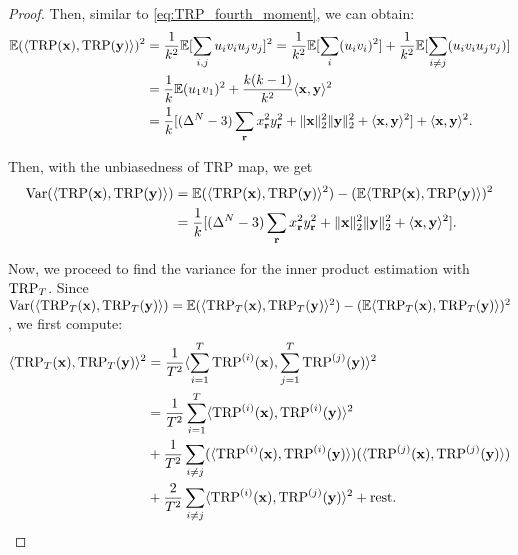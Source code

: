 \begin{proof}
Then, similar to \eqref{eq:TRP_fourth_moment}, we can obtain:  
\begin{equation}\label{eq:inner_prod_second_moment}
\begin{aligned}
\mathbb{E}(\langle \textup{TRP}(\mathbf{x}), \textup{TRP}(\mathbf{y}) \rangle)^2 &= \frac{1}{k^2}\mathbb{E}[ \sum_{i,j} u_iv_iu_jv_j]^2 
= \frac{1}{k^2}\mathbb{E}[ \sum_{i} (u_iv_i)^2]  + 
\frac{1}{k^2} \mathbb{E}[\sum_{i \neq j}(u_i v_i u_j v_j)]  \\
&= \frac{1}{k} \mathbb{E}(u_1v_1)^2 + \frac{k(k-1)}{k^2} \langle \mathbf{x}, \mathbf{y}\rangle^2\\ 
&= \frac{1}{k} [ (\Delta^N - 3) \sum_{\mathbf{r}}x_{\mathbf{r}}^2y_{\mathbf{r}}^2  + \|\mathbf{x}\|_2^2\|\mathbf{y}\|^2_2 + \langle \mathbf{x}, \mathbf{y} \rangle^2 ] + \langle \mathbf{x}, \mathbf{y}\rangle^2.
\end{aligned} 
\end{equation} 

Then, with the unbiasedness of TRP map, we get
\begin{equation}
\begin{aligned}
\textrm{Var}(\langle \textup{TRP}(\mathbf{x}) , \textup{TRP}(\mathbf{y}) \rangle) &= \mathbb{E}(\langle \textup{TRP}(\mathbf{x}), \textup{TRP}(\mathbf{y}) \rangle^2) - (\mathbb{E}\langle \textup{TRP}(\mathbf{x}), \textup{TRP}(\mathbf{y}) \rangle)^2 \\
&= \frac{1}{k} [ (\Delta^N - 3) \sum_{\mathbf{r}}x_{\mathbf{r}}^2y_{\mathbf{r}}^2  + \|\mathbf{x}\|_2^2\|\mathbf{y}\|^2_2 + \langle \mathbf{x}, \mathbf{y} \rangle^2].
\nonumber
\end{aligned}
\end{equation} 

Now, we proceed to find the variance for the inner product estimation with $\textup{TRP}_T$. Since $\mbox{Var}(\langle \textup{TRP}_T(\mathbf{x}), \textup{TRP}_T(\mathbf{y}) \rangle) = 
\mathbb{E}(\langle \textup{TRP}_T(\mathbf{x}), \textup{TRP}_T(\mathbf{y}) \rangle^2) - (\mathbb{E}\langle \textup{TRP}_T(\mathbf{x}), \textup{TRP}_T(\mathbf{y}) \rangle)^2$, we first compute: 
\begin{equation} 
\begin{aligned}
\langle \textup{TRP}_T(\mathbf{x}), \textup{TRP}_T(\mathbf{y}) \rangle^2 &= \frac{1}{T^2} \langle \sum_{i = 1}^T \textup{TRP}^{(i)}(\mathbf{x}),  \sum_{j = 1}^T \textup{TRP}^{(j)}(\mathbf{y}) \rangle^2\\
&= \frac{1}{T^2} \sum_{i =1}^T \langle  \textup{TRP}^{(i)}(\mathbf{x}), \textup{TRP}^{(i)}(\mathbf{y}) \rangle^2 \\
&+ \frac{1}{T^2}\sum_{i \neq j}(\langle  \textup{TRP}^{(i)}(\mathbf{x}), \textup{TRP}^{(i)}(\mathbf{y}) \rangle)(\langle  \textup{TRP}^{(j)}(\mathbf{x}), \textup{TRP}^{(j)}(\mathbf{y}) \rangle) \\
&+ \frac{2}{T^2}\sum_{i \neq j} \langle  \textup{TRP}^{(i)}(\mathbf{x}), \textup{TRP}^{(j)}(\mathbf{y}) \rangle^2 + \text{rest}.  \nonumber
\end{aligned} 
\end{equation}


\end{proof}
